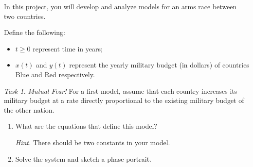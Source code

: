 In this project, you will develop and analyze models for an arms race between two countries. 

Define the following:
\begin{itemize}
	\item $t\geq 0$ represent time in years;
	\item $x(t)$ and $y(t)$ represent the yearly military budget (in dollars) of countries Blue and Red respectively. 
\end{itemize}


\emph{Task 1.} \emph{Mutual Fear!} 
For a first model, assume that each country increases its military budget at a rate directly proportional to the existing military budget of the other nation. 
\begin{enumerate}[label=\emph{(\alph*)}]
\item What are the equations that define this model? 

\emph{Hint.} There should be two constants in your model.

\item Solve the system and sketch a phase portrait.



\end{enumerate}
